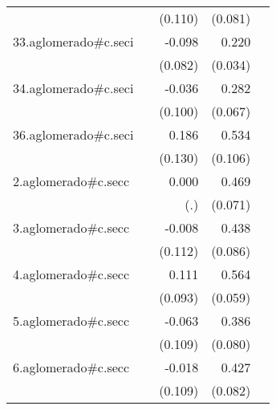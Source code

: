{\begin{longtable}{l*{4}{D{.}{.}{-1}}}
            &                     &     (0.110)         &     (0.081)         &                     \\
\addlinespace
33.aglomerado#c.seci&                     &      -0.098         &       0.220\sym{***}&                     \\
            &                     &     (0.082)         &     (0.034)         &                     \\
\addlinespace
34.aglomerado#c.seci&                     &      -0.036         &       0.282\sym{***}&                     \\
            &                     &     (0.100)         &     (0.067)         &                     \\
\addlinespace
36.aglomerado#c.seci&                     &       0.186         &       0.534\sym{***}&                     \\
            &                     &     (0.130)         &     (0.106)         &                     \\
\addlinespace
2.aglomerado#c.secc&                     &       0.000         &       0.469\sym{***}&                     \\
            &                     &         (.)         &     (0.071)         &                     \\
\addlinespace
3.aglomerado#c.secc&                     &      -0.008         &       0.438\sym{***}&                     \\
            &                     &     (0.112)         &     (0.086)         &                     \\
\addlinespace
4.aglomerado#c.secc&                     &       0.111         &       0.564\sym{***}&                     \\
            &                     &     (0.093)         &     (0.059)         &                     \\
\addlinespace
5.aglomerado#c.secc&                     &      -0.063         &       0.386\sym{***}&                     \\
            &                     &     (0.109)         &     (0.080)         &                     \\
\addlinespace
6.aglomerado#c.secc&                     &      -0.018         &       0.427\sym{***}&                     \\
            &                     &     (0.109)         &     (0.082)         &                     \\

\end{longtable}}
